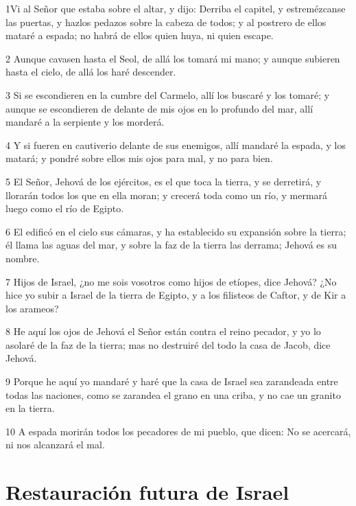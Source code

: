 \par 1Vi al Señor que estaba sobre el altar, y dijo: Derriba el capitel, y estremézcanse las puertas, y hazlos pedazos sobre la cabeza de todos; y al postrero de ellos mataré a espada; no habrá de ellos quien huya, ni quien escape.
\par 2 Aunque cavasen hasta el Seol, de allá los tomará mi mano; y aunque subieren hasta el cielo, de allá los haré descender.
\par 3 Si se escondieren en la cumbre del Carmelo, allí los buscaré y los tomaré; y aunque se escondieren de delante de mis ojos en lo profundo del mar, allí mandaré a la serpiente y los morderá.
\par 4 Y si fueren en cautiverio delante de sus enemigos, allí mandaré la espada, y los matará; y pondré sobre ellos mis ojos para mal, y no para bien.
\par 5 El Señor, Jehová de los ejércitos, es el que toca la tierra, y se derretirá, y llorarán todos los que en ella moran; y crecerá toda como un río, y mermará luego como el río de Egipto.
\par 6 El edificó en el cielo sus cámaras, y ha establecido su expansión sobre la tierra; él llama las aguas del mar, y sobre la faz de la tierra las derrama; Jehová es su nombre.
\par 7 Hijos de Israel, ¿no me sois vosotros como hijos de etíopes, dice Jehová? ¿No hice yo subir a Israel de la tierra de Egipto, y a los filisteos de Caftor, y de Kir a los arameos?
\par 8 He aquí los ojos de Jehová el Señor están contra el reino pecador, y yo lo asolaré de la faz de la tierra; mas no destruiré del todo la casa de Jacob, dice Jehová. 
\par 9 Porque he aquí yo mandaré y haré que la casa de Israel sea zarandeada entre todas las naciones, como se zarandea el grano en una criba, y no cae un granito en la tierra.
\par 10 A espada morirán todos los pecadores de mi pueblo, que dicen: No se acercará, ni nos alcanzará el mal.

\section*{Restauración futura de Israel}


